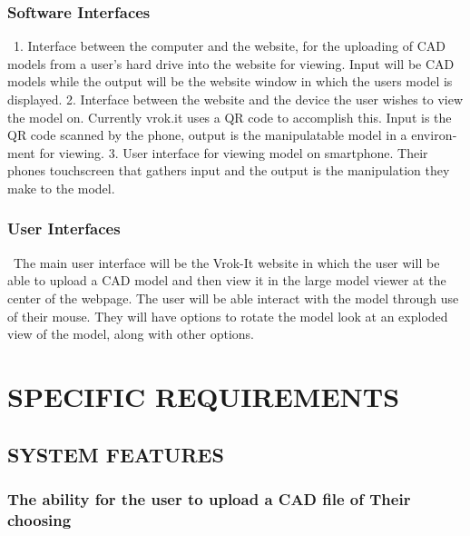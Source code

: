 \documentclass[letterpaper, 10pt, draftclsnofoot, onecolumn]{IEEEtran}
\begin{document}
{\subsubsection[Software
Interfaces]{\rmfamily\bfseries\color{black}
Software Interfaces}
{\color{black}
\foreignlanguage{english}{\ }\foreignlanguage{english}{1.	Interface between the computer and the website, for the uploading of CAD models from a user's hard drive into the website for viewing. Input will be CAD models while the output will be the website window in which the users model is displayed.
2.	Interface between the website and the device the user wishes to view the model on. Currently vrok.it uses a QR code to accomplish this. Input is the QR code scanned by the phone, output is the manipulatable model in a environment for viewing.
3.	User interface for viewing model on smartphone. Their phones touchscreen that gathers input and the output is the manipulation they make to the model.
}}

\subsubsection[User
Interfaces]{\rmfamily\bfseries\color{black}
User Interfaces}
{\color{black}
\foreignlanguage{english}{\ }\foreignlanguage{english}{The main user interface will be the Vrok-It website in which the user will be able to upload a CAD model and then view it in the large model viewer at the center of the webpage. The user will be able interact with the model through use of their mouse. They will have options to rotate the model look at an exploded view of the model, along with other options. }}


\clearpage\setcounter{page}{1}\pagestyle{Convertv}

\section[SPECIFIC
REQUIREMENTS]{\rmfamily\bfseries\color{black}
SPECIFIC REQUIREMENTS}


\subsection[SYSTEM
FEATURES]{\rmfamily\bfseries\color{black}
SYSTEM FEATURES}

\bigskip

\subsubsection[{File upload}]{\rmfamily\bfseries\color{black}The ability for the user to upload a CAD file of Their choosing}
}
\end{document}
